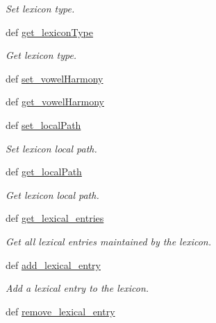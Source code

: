 \begin{DoxyCompactItemize}
\begin{DoxyCompactList}\small\item\em Set lexicon type. \end{DoxyCompactList}\item 
def \hyperlink{classlmf_1_1src_1_1core_1_1lexicon_1_1_lexicon_a86af37677fcdccbe00c1dc1ba19e0dbb}{get\+\_\+lexicon\+Type}
\begin{DoxyCompactList}\small\item\em Get lexicon type. \end{DoxyCompactList}\item 
def \hyperlink{classlmf_1_1src_1_1core_1_1lexicon_1_1_lexicon_af8b24fc50070179d1abf29f03559ddcc}{set\+\_\+vowel\+Harmony}
\item 
def \hyperlink{classlmf_1_1src_1_1core_1_1lexicon_1_1_lexicon_ab9647a29884f0d53a93842d4627cf64d}{get\+\_\+vowel\+Harmony}
\item 
def \hyperlink{classlmf_1_1src_1_1core_1_1lexicon_1_1_lexicon_a5adcd94ffcb7e44b1a005f2a00f3e440}{set\+\_\+local\+Path}
\begin{DoxyCompactList}\small\item\em Set lexicon local path. \end{DoxyCompactList}\item 
def \hyperlink{classlmf_1_1src_1_1core_1_1lexicon_1_1_lexicon_ac5b716ace69f5433935bf6f00b18f8c7}{get\+\_\+local\+Path}
\begin{DoxyCompactList}\small\item\em Get lexicon local path. \end{DoxyCompactList}\item 
def \hyperlink{classlmf_1_1src_1_1core_1_1lexicon_1_1_lexicon_a148e94a7d0a744b510ee81e53c51e0b0}{get\+\_\+lexical\+\_\+entries}
\begin{DoxyCompactList}\small\item\em Get all lexical entries maintained by the lexicon. \end{DoxyCompactList}\item 
def \hyperlink{classlmf_1_1src_1_1core_1_1lexicon_1_1_lexicon_aaa470820fbda4be04d6fe9139e761773}{add\+\_\+lexical\+\_\+entry}
\begin{DoxyCompactList}\small\item\em Add a lexical entry to the lexicon. \end{DoxyCompactList}\item 
def \hyperlink{classlmf_1_1src_1_1core_1_1lexicon_1_1_lexicon_a36f348d30a1193d216ac7dacd5f085be}{remove\+\_\+lexical\+\_\+entry}

\end{DoxyCompactItemize}
